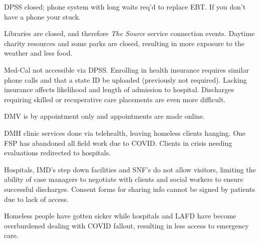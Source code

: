 \documentclass[11pt]{article}
\begin{document}
DPSS closed; phone system with long waits req'd to replace EBT. If you don't have a phone your stuck.

Libraries are closed, and therefore {\it The Source} service connection events. Daytime charity resources and some parks are 
closed, resulting in more exposure to the weather and less food.

Med-Cal not accessible via DPSS. Enrolling in health insurance requires similar phone calls and that a state ID be uploaded 
(previously not required). Lacking insurance affects likelihood and length of admission to hospital. Discharges requiring skilled 
or recuperative care placements are even more difficult.

DMV is by appointment only and appointments are made online.

DMH clinic services done via telehealth, leaving homeless clients hanging. One FSP has abandoned all field work due to COVID. 
Clients in crisis needing evaluations redirected to hospitals.

Hospitals, IMD's step down facilities and SNF's do not allow visitors, limiting the ability of case managers to negotiate 
with clients and social workers to ensure successful discharges. Consent forms for sharing info cannot be signed by patients 
due to lack of access.

Homeless people have gotten sicker while hospitals and LAFD have become overburdened dealing with COVID fallout, 
resulting in less access to emergency care.

%
\end{document}
